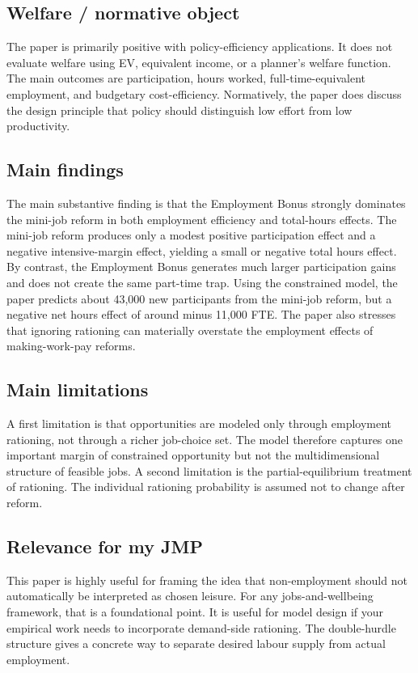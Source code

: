 \documentclass[11pt,a4paper]{article}
\begin{document}
\subsection*{Welfare / normative object}
The paper is primarily positive with policy-efficiency applications. It does not evaluate welfare using EV, equivalent income, or a planner’s welfare function. The main outcomes are participation, hours worked, full-time-equivalent employment, and budgetary cost-efficiency. Normatively, the paper does discuss the design principle that policy should distinguish low effort from low productivity.

\subsection*{Main findings}
The main substantive finding is that the Employment Bonus strongly dominates the mini-job reform in both employment efficiency and total-hours effects. The mini-job reform produces only a modest positive participation effect and a negative intensive-margin effect, yielding a small or negative total hours effect. By contrast, the Employment Bonus generates much larger participation gains and does not create the same part-time trap. Using the constrained model, the paper predicts about 43,000 new participants from the mini-job reform, but a negative net hours effect of around minus 11,000 FTE. The paper also stresses that ignoring rationing can materially overstate the employment effects of making-work-pay reforms.

\subsection*{Main limitations}
A first limitation is that opportunities are modeled only through employment rationing, not through a richer job-choice set. The model therefore captures one important margin of constrained opportunity but not the multidimensional structure of feasible jobs. A second limitation is the partial-equilibrium treatment of rationing. The individual rationing probability is assumed not to change after reform.

\subsection*{Relevance for my JMP}
This paper is highly useful for framing the idea that non-employment should not automatically be interpreted as chosen leisure. For any jobs-and-wellbeing framework, that is a foundational point. It is useful for model design if your empirical work needs to incorporate demand-side rationing. The double-hurdle structure gives a concrete way to separate desired labour supply from actual employment.
\end{document}
